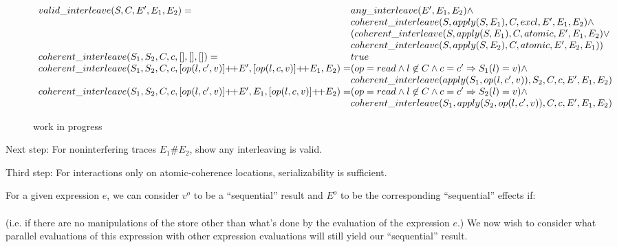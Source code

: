 \begin{figure*}
$
\begin{array}{l@{}l}
valid\_interleave(S, C, E', E_1, E_2) = & any\_interleave(E', E_1, E_2) \wedge \\
& coherent\_interleave(S, apply(S, E_1), C, excl, E', E_1, E_2) \wedge \\
& (coherent\_interleave(S, apply(S, E_1), C, atomic, E', E_1, E_2) \vee \\
& coherent\_interleave(S, apply(S, E_2), C, atomic, E', E_2, E_1)) \\

coherent\_interleave(S_1, S_2, C, c, [], [], []) = & true \\
coherent\_interleave(S_1, S_2, C, c, [ op(l, c', v) ] \dplus E', [ op(l, c, v) ] \dplus E_1, E_2) = & (op = read \wedge l \not\in C \wedge c = c' \Rightarrow S_1(l) = v) \wedge \\
& coherent\_interleave(apply(S_1, op(l, c', v)), S_2, C, c, E', E_1, E_2) \\
coherent\_interleave(S_1, S_2, C, c, [ op(l, c', v) ] \dplus E', E_1, [ op(l, c, v) ] \dplus E_2) = & (op = read \wedge l \not\in C \wedge c = c' \Rightarrow S_2(l) = v) \wedge \\
& coherent\_interleave(S_1, apply(S_2, op(l, c', v)), C, c, E', E_1, E_2)
\end{array}
$
\caption{work in progress}
\end{figure*}


Next step: For noninterfering traces $E_1 \# E_2$, show any interleaving is valid.

Third step: For interactions only on atomic-coherence locations, serializability is sufficient.

For a given expression $e$, we can consider $v^o$ to be a ``sequential'' result and $E^o$ to be the corresponding ``sequential'' effects if: \\

 \\

(i.e. if there are no manipulations of the store other than what's done by
the evaluation of the expression $e$.)  We now wish to consider what parallel
evaluations of this expression with other expression evaluations will still
yield our ``sequential'' result. \\


